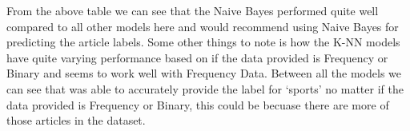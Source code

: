 \documentclass[8pt]{extarticle}
\begin{document}
From the above table we can see that the Naive Bayes performed quite
well compared to all other models here and would recommend using Naive
Bayes for predicting the article labels. Some other things to note is
how the K-NN models have quite varying performance based on if the data
provided is Frequency or Binary and seems to work well with Frequency
Data. Between all the models we can see that was able to accurately
provide the label for `sports' no matter if the data provided is
Frequency or Binary, this could be becuase there are more of those
articles in the dataset.


\end{document}
